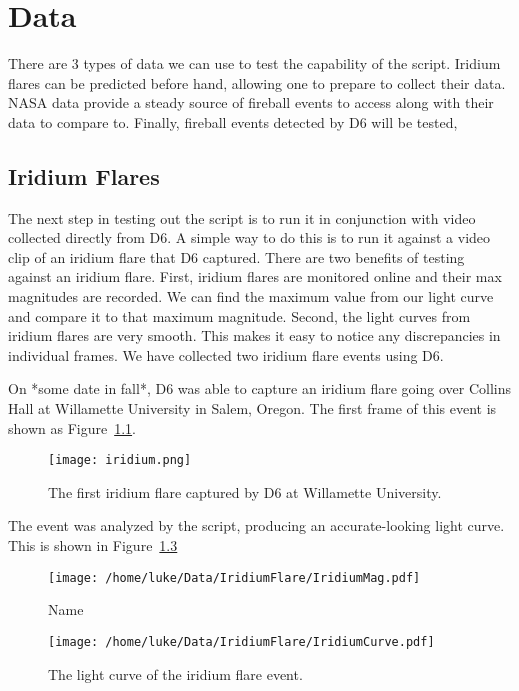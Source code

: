 \chapter{Data}

There are 3 types of data we can use to test the capability of the script. Iridium flares can be predicted before hand, allowing one to prepare to collect their data. NASA data provide a steady source of fireball events to access along with their data to compare to. Finally, fireball events detected by D6 will be tested, 

\section{Iridium Flares}

The next step in testing out the script is to run it in conjunction with video collected directly from D6. A simple way to do this is to run it against a video clip of an iridium flare that D6 captured. There are two benefits of testing against an iridium flare. First, iridium flares are monitored online and their max magnitudes are recorded. We can find the maximum value from our light curve and compare it to that maximum magnitude. Second, the light curves from iridium flares are very smooth. This makes it easy to notice any discrepancies in individual frames. We have collected two iridium flare events using D6. 

On *some date in fall*, D6 was able to capture an iridium flare going over Collins Hall at Willamette University in Salem, Oregon. The first frame of this event is shown as Figure~\ref{fig:iridium}. 

\begin{figure}[ht!]
	\centering
	\texttt{[image: iridium.png]}
	\caption{The first iridium flare captured by D6 at Willamette University.}
	\label{fig:iridium}
\end{figure}

The event was analyzed by the script, producing an accurate-looking light curve. This is shown in Figure~\ref{fig:iridiumcurve}

\begin{figure}[ht!]
	\centering
	\texttt{[image: /home/luke/Data/IridiumFlare/IridiumMag.pdf]}
	\caption{Name}
	\label{fig:iridiummag}
\end{figure}

\begin{figure}[ht!]
	\centering
	\texttt{[image: /home/luke/Data/IridiumFlare/IridiumCurve.pdf]}
	\caption{The light curve of the iridium flare event.}
	\label{fig:iridiumcurve}
\end{figure}

